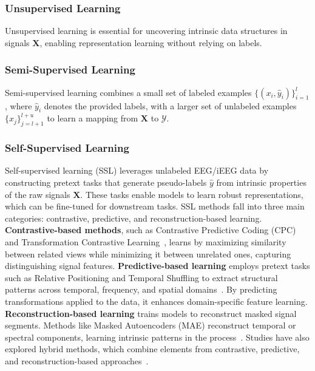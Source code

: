 \subsubsection{Unsupervised Learning}
Unsupervised learning is essential for uncovering intrinsic data structures in signals $\mathbf{X}$, enabling representation learning without relying on labels. 

\subsubsection{Semi-Supervised Learning}
Semi-supervised learning combines a small set of labeled examples $\{(x_i, \hat{y}_i)\}_{i=1}^l$, where $\hat{y}_i$ denotes the provided labels, with a larger set of unlabeled examples $\{x_j\}_{j=l+1}^{l+u}$ to learn a mapping from $\mathbf{X}$ to $\mathcal{Y}$. 

\subsubsection{Self-Supervised Learning}
Self-supervised learning (SSL) leverages unlabeled EEG/iEEG data by constructing pretext tasks that generate pseudo-labels $\hat{y}$ from intrinsic properties of the raw signals $\mathbf{X}$. These tasks enable models to learn robust representations, which can be fine-tuned for downstream tasks.
SSL methods fall into three main categories: contrastive, predictive, and reconstruction-based learning.
\textbf{Contrastive-based methods}, such as Contrastive Predictive Coding (CPC)~\cite{banville2021uncovering} and Transformation Contrastive Learning~\cite{mohsenvand2020contrastive}, learns by maximizing similarity between related views while minimizing it between unrelated ones, capturing distinguishing signal features.
\textbf{Predictive-based learning} employs pretext tasks such as Relative Positioning and Temporal Shuffling to extract structural patterns across temporal, frequency, and spatial domains~\cite{banville2019self, oord2018representation}. By predicting transformations applied to the data, it enhances domain-specific feature learning.
\textbf{Reconstruction-based learning} trains models to reconstruct masked signal segments. Methods like Masked Autoencoders (MAE) reconstruct temporal or spectral components, learning intrinsic patterns in the process~\cite{Kostas2021BENDR, wu2022neuro2vec}.
Studies have also explored hybrid methods, which combine elements from contrastive, predictive, and reconstruction-based approaches~\cite{cai2023mbrain, banville2021uncovering}.
